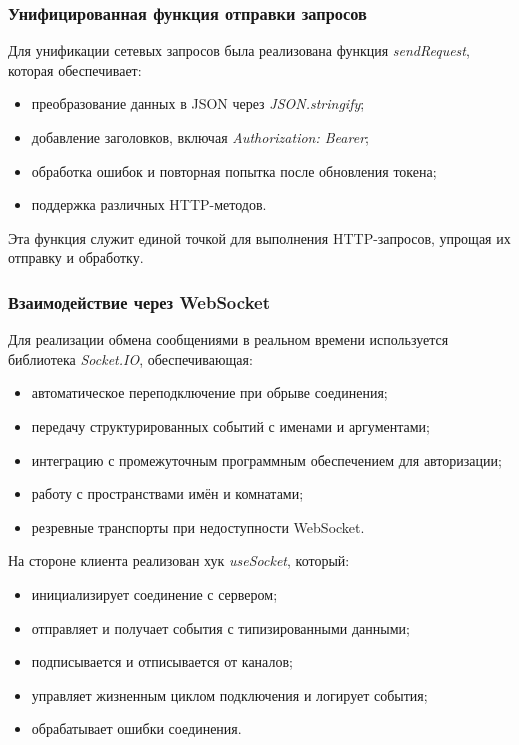 \subsubsection{Унифицированная функция отправки запросов}
Для унификации сетевых запросов была реализована функция \textit{sendRequest}, которая обеспечивает:

\begin{itemize}
  \item преобразование данных в JSON через \textit{JSON.stringify};
  \item добавление заголовков, включая \textit{Authorization: Bearer};
  \item обработка ошибок и повторная попытка после обновления токена;
  \item поддержка различных HTTP-методов.
\end{itemize}

Эта функция служит единой точкой для выполнения HTTP-запросов, упрощая их отправку и обработку.

\subsubsection{Взаимодействие через WebSocket}
Для реализации обмена сообщениями в реальном времени используется библиотека \textit{Socket.IO}, обеспечивающая:
\begin{itemize}
  \item автоматическое переподключение при обрыве соединения;
  \item передачу структурированных событий с именами и аргументами;
  \item интеграцию с промежуточным программным обеспечением для авторизации;
  \item работу с пространствами имён и комнатами;
  \item резревные транспорты при недоступности WebSocket.
\end{itemize}

На стороне клиента реализован хук \textit{useSocket}, который:
\begin{itemize}
  \item инициализирует соединение с сервером;
  \item отправляет и получает события с типизированными данными;
  \item подписывается и отписывается от каналов;
  \item управляет жизненным циклом подключения и логирует события;
  \item обрабатывает ошибки соединения.
\end{itemize}

